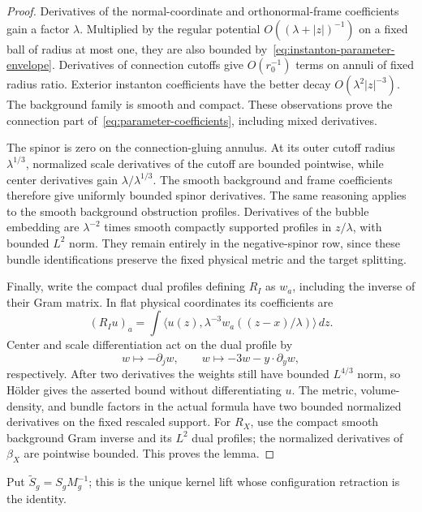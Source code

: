 \documentclass[11pt]{amsart}
\theoremstyle{definition}
\theoremstyle{remark}
\theoremstyle{plain}
\begin{document}
\begin{proof}
Derivatives of the normal-coordinate and orthonormal-frame coefficients
gain a factor $\lambda$.  Multiplied by the regular potential
$O((\lambda+|z|)^{-1})$ on a fixed ball of radius at most one, they
are also bounded by~\eqref{eq:instanton-parameter-envelope}.
Derivatives of connection cutoffs give $O(r_0^{-1})$ terms on annuli
of fixed radius ratio.  Exterior instanton coefficients have the better
decay $O(\lambda^2|z|^{-3})$.  The background family is smooth and compact.
These observations prove the connection part
of~\eqref{eq:parameter-coefficients}, including mixed derivatives.

The spinor is zero on the connection-gluing annulus.  At its outer cutoff
radius $\lambda^{1/3}$, normalized scale derivatives of the cutoff are
bounded pointwise, while center derivatives gain
$\lambda/\lambda^{1/3}$.  The smooth background and frame coefficients
therefore give uniformly bounded spinor derivatives.  The same reasoning
applies to the smooth background obstruction profiles.  Derivatives of
the bubble embedding are $\lambda^{-2}$ times smooth compactly supported
profiles in $z/\lambda$, with bounded $L^2$ norm.  They remain entirely
in the negative-spinor row, since these bundle identifications preserve
the fixed physical metric and the target splitting.

Finally, write the compact dual profiles defining $R_I$ as $w_a$,
including the inverse of their Gram matrix.  In flat physical coordinates
its coefficients are
\begin{equation}\label{eq:physical-dual-retraction}
 (R_Iu)_a=\int\langle u(z),
       \lambda^{-3}w_a((z-x)/\lambda)\rangle\,dz.
\end{equation}
Center and scale differentiation act on the dual profile by
\begin{equation}\label{eq:dual-profile-derivatives}
 w\longmapsto-\partial_jw,\qquad
 w\longmapsto-3w-y\cdot\partial_yw,
\end{equation}
respectively.  After two derivatives the weights still have bounded
$L^{4/3}$ norm, so H\"older gives the asserted bound without
differentiating $u$.  The metric, volume-density, and bundle factors in
the actual formula have two bounded normalized derivatives on the fixed
rescaled support.  For $R_X$, use the compact smooth background Gram
inverse and its $L^2$ dual profiles; the normalized derivatives of
$\beta_X$ are pointwise bounded.  This proves the lemma.
\end{proof}

Put $\widetilde S_g=S_gM_g^{-1}$; this is the unique kernel lift
whose configuration retraction is the identity.
\end{document}
